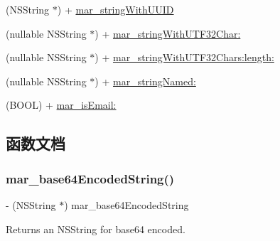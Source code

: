 \begin{DoxyCompactItemize}
\item 
(N\+S\+String $\ast$) + \hyperlink{category_n_s_string_07_m_a_r_e_x_08_a8b496142ddde54881c5a2df2b3f31b99}{mar\+\_\+string\+With\+U\+U\+ID}
\item 
(nullable N\+S\+String $\ast$) + \hyperlink{category_n_s_string_07_m_a_r_e_x_08_abeac9eec14bc50383c6c0f62d8851d13}{mar\+\_\+string\+With\+U\+T\+F32\+Char\+:}
\item 
(nullable N\+S\+String $\ast$) + \hyperlink{category_n_s_string_07_m_a_r_e_x_08_acc299109ecfb2f44dedabaaf84249a5b}{mar\+\_\+string\+With\+U\+T\+F32\+Chars\+:length\+:}
\item 
(nullable N\+S\+String $\ast$) + \hyperlink{category_n_s_string_07_m_a_r_e_x_08_a14b49133e6fc3cda4a6e42bb6f3c78c0}{mar\+\_\+string\+Named\+:}
\item 
(B\+O\+OL) + \hyperlink{category_n_s_string_07_m_a_r_e_x_08_ac342a2eb96f2ff221be11746dc81d6b8}{mar\+\_\+is\+Email\+:}
\end{DoxyCompactItemize}


\subsection{函数文档}
\mbox{\label{category_n_s_string_07_m_a_r_e_x_08_ab6af857a6d843090e7fe95b5102111cb}} 
\subsubsection{\texorpdfstring{mar\+\_\+base64\+Encoded\+String()}{mar\_base64EncodedString()}}
{\footnotesize\ttfamily -\/ (N\+S\+String $\ast$) mar\+\_\+base64\+Encoded\+String \begin{DoxyParamCaption}{ }\end{DoxyParamCaption}}

Returns an N\+S\+String for base64 encoded. \mbox{\label{category_n_s_string_07_m_a_r_e_x_08_a00c8f34a46386a52983074adc115c858}} 
